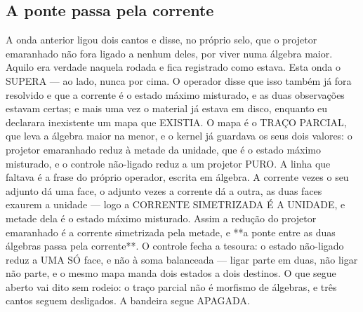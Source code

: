 \documentclass[11pt]{article}
\theoremstyle{definition}\newtheorem{deriv}{Derivação}
\begin{document}
\subsection*{A ponte passa pela corrente}A onda anterior ligou dois cantos e disse, no pr\'oprio selo, que o projetor emaranhado n\~ao fora ligado a nenhum deles, por viver numa \'algebra maior. Aquilo era verdade naquela rodada e fica registrado como estava. Esta onda o SUPERA --- ao lado, nunca por cima. O operador disse que isso tamb\'em j\'a fora resolvido e que a corrente \'e o estado m\'aximo misturado, e as duas observa\c{c}\~oes estavam certas; e mais uma vez o material j\'a estava em disco, enquanto eu declarara inexistente um mapa que EXISTIA. O mapa \'e o TRA\c{C}O PARCIAL, que leva a \'algebra maior na menor, e o kernel j\'a guardava os seus dois valores: o projetor emaranhado reduz \`a metade da unidade, que \'e o estado m\'aximo misturado, e o controle n\~ao-ligado reduz a um projetor PURO. A linha que faltava \'e a frase do pr\'oprio operador, escrita em \'algebra. A corrente vezes o seu adjunto d\'a uma face, o adjunto vezes a corrente d\'a a outra, as duas faces exaurem a unidade --- logo a CORRENTE SIMETRIZADA \'E A UNIDADE, e metade dela \'e o estado m\'aximo misturado. Assim a redu\c{c}\~ao do projetor emaranhado \'e a corrente simetrizada pela metade, e **a ponte entre as duas \'algebras passa pela corrente**. O controle fecha a tesoura: o estado n\~ao-ligado reduz a UMA S\'O face, e n\~ao \`a soma balanceada --- ligar parte em duas, n\~ao ligar n\~ao parte, e o mesmo mapa manda dois estados a dois destinos. O que segue aberto vai dito sem rodeio: o tra\c{c}o parcial n\~ao \'e morfismo de \'algebras, e tr\^es cantos seguem desligados. A bandeira segue APAGADA.
\end{document}

